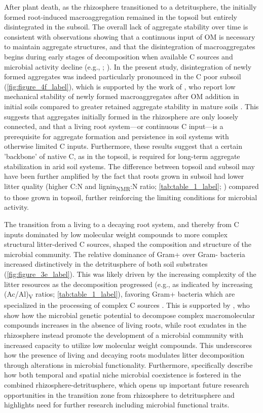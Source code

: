 After plant death, as the rhizosphere transitioned to a detritusphere, the initially formed root-induced macroaggregation remained in the topsoil but entirely disintegrated in the subsoil. The overall lack of aggregate stability over time is consistent with observations showing that a continuous input of OM is necessary to maintain aggregate structures, and that the disintegration of macroaggregates begins during early stages of decomposition when available C sources and microbial activity decline (e.g., \citealp{Golchin1997}; \citealp{Helfrich2008}). In the present study, disintegration of newly formed aggregates was indeed particularly pronounced in the C poor subsoil (\cref{fig:figure_4f_label}), which is supported by the work of \citet{Bucka2021}, who report low mechanical stability of newly formed macroaggregates after OM addition in initial soils compared to greater retained aggregate stability in mature soils \citep{Felde2020}. This suggests that aggregates initially formed in the rhizosphere are only loosely connected, and that a living root system---or continuous C input---is a prerequisite for aggregate formation and persistence in soil systems with otherwise limited C inputs. Furthermore, these results suggest that a certain 'backbone' of native C, as in the topsoil, is required for long-term aggregate stabilization in arid soil systems. The difference between topsoil and subsoil may have been further amplified by the fact that roots grown in subsoil had lower litter quality (higher C:N and lignin\textsubscript{NMR}:N ratio; \cref{tab:table_1_label}; \citealp{Walela2014}) compared to those grown in topsoil, further reinforcing the limiting conditions for microbial activity.

The transition from a living to a decaying root system, and thereby from C inputs dominated by low molecular weight compounds to more complex structural litter-derived C sources, shaped the composition and structure of the microbial community. The relative dominance of Gram+ over Gram- bacteria increased distinctively in the detritusphere of both soil substrates (\cref{fig:figure_3e_label}). This was likely driven by the increasing complexity of the litter resources as the decomposition progressed (e.g., as indicated by increasing (Ac/Al)\textsubscript{V} ratios; \cref{tab:table_1_label}), favoring Gram+ bacteria which are specialized in the processing of complex C sources \citep{Fanin2019, Denef2009, Butler2003}. This is supported by \citet{Shi2018}, who show how the microbial genetic potential to decompose complex macromolecular compounds increases in the absence of living roots, while root exudates in the rhizosphere instead promote the development of a microbial community with increased capacity to utilize low molecular weight compounds. This underscores how the presence of living and decaying roots modulates litter decomposition through alterations in microbial functionality. Furthermore, \citet{Nuccio2020} specifically describe how both temporal and spatial niche microbial coexistence is fostered in the combined rhizosphere-detritusphere, which opens up important future research opportunities in the transition zone from rhizosphere to detritusphere and highlights need for further research including microbial functional traits.

